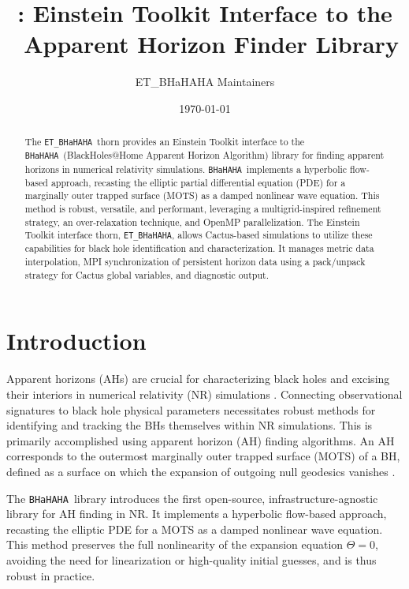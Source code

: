 \documentclass[a4paper,11pt]{article}
\title{\ETBHaHAHA: Einstein Toolkit Interface to the \bhahlib\ Apparent Horizon Finder Library}
\author{ET\_BHaHAHA Maintainers}
\date{\today}
\newcommand{\thorn}[1]{{\tt #1}}
\newcommand{\BHaHAHA}{\thorn{ET\_BHaHAHA}} %
\newcommand{\bhahlib}{\texttt{BHaHAHA}} %
\begin{document}
\maketitle
\tableofcontents
\clearpage


\begin{abstract}
The \BHaHAHA\ thorn provides an Einstein Toolkit interface to the \bhahlib\ (BlackHoles@Home Apparent Horizon Algorithm) library for finding apparent horizons in numerical relativity simulations. \bhahlib\ implements a hyperbolic flow-based approach, recasting the elliptic partial differential equation (PDE) for a marginally outer trapped surface (MOTS) as a damped nonlinear wave equation. This method is robust, versatile, and performant, leveraging a multigrid-inspired refinement strategy, an over-relaxation technique, and OpenMP parallelization. The Einstein Toolkit interface thorn, \BHaHAHA, allows Cactus-based simulations to utilize these capabilities for black hole identification and characterization. It manages metric data interpolation, MPI synchronization of persistent horizon data using a pack/unpack strategy for Cactus global variables, and diagnostic output.
\end{abstract}

\section{Introduction}
\label{sec:introduction}

Apparent horizons (AHs) are crucial for characterizing black holes and excising their interiors in numerical relativity (NR) simulations \cite{Thornburg07LR}. Connecting observational signatures to black hole physical parameters necessitates robust methods for identifying and tracking the BHs themselves within NR simulations. This is primarily accomplished using apparent horizon (AH) finding algorithms. An AH corresponds to the outermost marginally outer trapped surface (MOTS) of a BH, defined as a surface on which the expansion of outgoing null geodesics vanishes \cite{Penrose65, Senovilla11, Thornburg04AHF}.

The \bhahlib\ library \cite{Etienne2025etal} introduces the first open-source, infrastructure-agnostic library for AH finding in NR. It implements a hyperbolic flow-based approach, recasting the elliptic PDE for a MOTS as a damped nonlinear wave equation. This method preserves the full nonlinearity of the expansion equation $\Theta=0$, avoiding the need for linearization or high-quality initial guesses, and is thus robust in practice.
\end{document}
